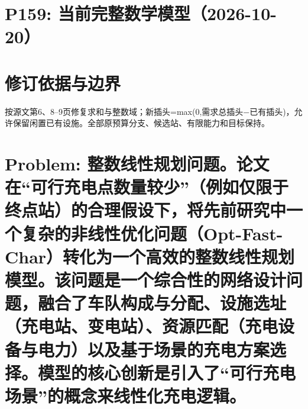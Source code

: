 \documentclass[11pt]{ctexart}
\begin{document}
\section*{P159: 当前完整数学模型（2026-10-20）}
\section*{修订依据与边界}按源文第6、8–9页修复求和与整数域；新插头=max(0,需求总插头−已有插头)，允许保留闲置已有设施。全部原预算分支、候选站、有限能力和目标保持。


\section*{Problem: 整数线性规划问题。论文在“可行充电点数量较少”（例如仅限于终点站）的合理假设下，将先前研究中一个复杂的非线性优化问题（Opt-Fast-Char）转化为一个高效的整数线性规划模型。该问题是一个综合性的网络设计问题，融合了车队构成与分配、设施选址（充电站、变电站）、资源匹配（充电设备与电力）以及基于场景的充电方案选择。模型的核心创新是引入了“可行充电场景”的概念来线性化充电逻辑。}
\end{document}
